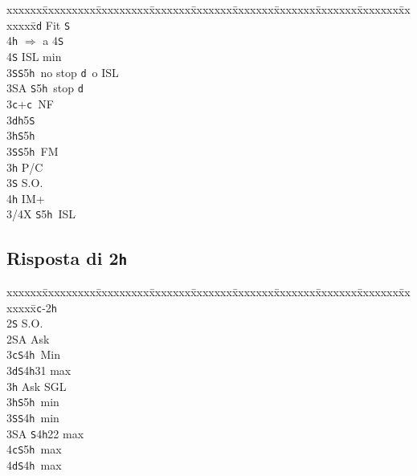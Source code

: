 \documentclass[a4paper,italian]{article}
\newcommand{\BS}{\small{\texttt{S}}}
\newcommand{\BC}{\small{\texttt{c}}}
\newcommand{\BD}{\small{\texttt{d}}}
\newcommand{\BH}{\small{\texttt{h}}}
\newcommand{\pdfh}{\texorpdfstring{\texttt{h}}{H}}
\newenvironment{bidtable}
{\begin{tabbing}

    xxxxxx\=xxxxxxxxx\=xxxxxxxxx\=xxxxxxx\=xxxxxxx\=xxxxxxx\=xxxxxxx\=xxxxxxx\=xxxxxxx\=xxxxxxx\=\kill}
{\end{tabbing} }%
\begin{document}
\begin{multicols}{2}
\begin{bidtable}
        4\BD \> Fit \BS \+\\
        4\BH \> $\Rightarrow$ a 4\BS \+\\
        4\BS \> ISL min\-\-\-\\
        3\BS {}\BS 5\BH\ no stop \BD\ o ISL\\
        3\small{SA} \BS 5\BH\ stop \BD \-\\
        3\BC {}+\BC\ NF\+\\
        3\BD {}\BH 5\BS \\
        3\BH {}\BS 5\BH \\
        3\BS {}\BS 5\BH\ FM\-\\
        3\BH \> P/C\+\\
        3\BS \> S.O.\\
        4\BH \> IM+\\
        3/4X \BS 5\BH\ ISL\-\-
    \end{bidtable}

    \subsection{Risposta di 2\pdfh}

    \begin{bidtable}
        1\BC-2\BH\+\\
        2\BS \> S.O.\\
        2\small{SA} \> Ask\+\\
        3\BC {}\BS 4\BH\ Min\\
        3\BD {}\BS 4\BH 31 max\+\\
        3\BH \> Ask SGL\-\\
        3\BH {}\BS 5\BH\ min\\
        3\BS {}\BS 4\BH\ min\\
        3\small{SA} \BS 4\BH 22 max\\
        4\BC {}\BS 5\BH\ max\\
        4\BD {}\BS 4\BH\ max\-\-
    \end{bidtable}
\end{multicols}
\end{document}
